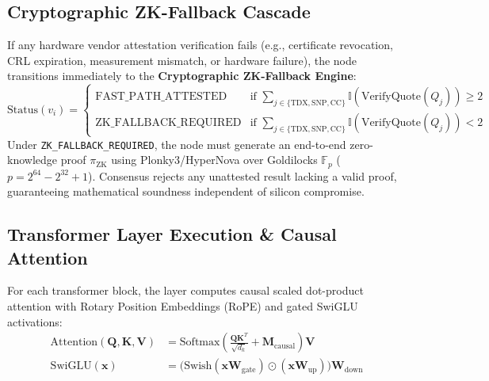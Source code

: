 \documentclass[10pt,twocolumn,letterpaper]{article}
\begin{document}
\subsection{Cryptographic ZK-Fallback Cascade}
If any hardware vendor attestation verification fails (e.g., certificate revocation, CRL expiration, measurement mismatch, or hardware failure), the node transitions immediately to the \textbf{Cryptographic ZK-Fallback Engine}:
\begin{equation}
\text{Status}(v_i) = \begin{cases} 
\text{FAST\_PATH\_ATTESTED} & \text{if } \sum_{j \in \{\text{TDX}, \text{SNP}, \text{CC}\}} \mathbb{I}(\text{VerifyQuote}(Q_j)) \ge 2 \\ 
\text{ZK\_FALLBACK\_REQUIRED} & \text{if } \sum_{j \in \{\text{TDX}, \text{SNP}, \text{CC}\}} \mathbb{I}(\text{VerifyQuote}(Q_j)) < 2 
\end{cases}
\end{equation}
Under \texttt{ZK\_FALLBACK\_REQUIRED}, the node must generate an end-to-end zero-knowledge proof $\pi_{\text{ZK}}$ using Plonky3/HyperNova over Goldilocks $\mathbb{F}_p$ ($p = 2^{64} - 2^{32} + 1$). Consensus rejects any unattested result lacking a valid proof, guaranteeing mathematical soundness independent of silicon compromise.

\subsection{Transformer Layer Execution \& Causal Attention}
For each transformer block, the layer computes causal scaled dot-product attention \cite{vaswani2017attention} with Rotary Position Embeddings (RoPE) \cite{su2024roformer} and gated SwiGLU activations:
\begin{align}
\text{Attention}(\mathbf{Q}, \mathbf{K}, \mathbf{V}) &= \text{Softmax}\left(\frac{\mathbf{Q} \mathbf{K}^T}{\sqrt{d_k}} + \mathbf{M}_{\text{causal}}\right) \mathbf{V} \\
\text{SwiGLU}(\mathbf{x}) &= \Big(\text{Swish}(\mathbf{x} \mathbf{W}_{\text{gate}}) \odot (\mathbf{x} \mathbf{W}_{\text{up}})\Big) \mathbf{W}_{\text{down}}
\end{align}
\end{document}
